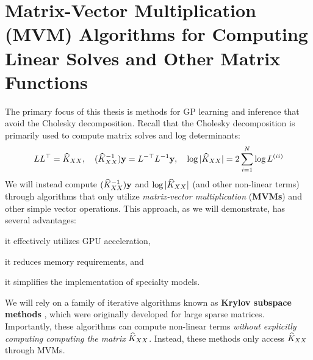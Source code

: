 \section{Matrix-Vector Multiplication (MVM) Algorithms for Computing Linear Solves and Other Matrix Functions}
\label{sec:mvms}


The primary focus of this thesis is methods for GP learning and inference that avoid the Cholesky decomposition.
Recall that the Cholesky decomposition is primarily used to compute matrix solves and log determinants:
\[
  L L^\top = \widehat{K}_{XX}, \quad
  (\widehat{K}_{XX}^{-1}) \mathbf{y} = L^{-\top} L^{-1} \mathbf{y}, \quad
  \log \vert \widehat{K}_{XX} \vert = 2 \sum_{i=1}^N \log L^{(ii)}
\]
We will instead compute $(\widehat{K}_{XX}^{-1}) \mathbf{y}$ and $\log \vert \widehat{K}_{XX} \vert$ (and other non-linear terms) through algorithms that only utilize \emph{matrix-vector multiplication} ({\bf MVMs}) and other simple vector operations.
This approach, as we will demonstrate, has several advantages:
%
\begin{enumerate*}
  \item it effectively utilizes GPU acceleration,
  \item it reduces memory requirements, and
  \item it simplifies the implementation of specialty models.
\end{enumerate*}
%
We will rely on a family of iterative algorithms known as {\bf Krylov subspace methods} \citep[e.g.][]{saad2003iterative,van2003iterative}, which were originally developed for large sparse matrices.
Importantly, these algorithms can compute non-linear terms \emph{without explicitly computing computing the matrix} $\widehat{K}_{XX}$.
Instead, these methods only access $\widehat{K}_{XX}$ through MVMs.

